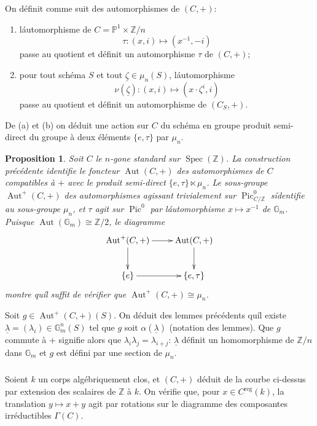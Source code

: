\documentclass{amsart}
\theoremstyle{plain}
\newtheorem{proposition}[theorem]{Proposition}
\theoremstyle{remark}
\DeclareMathOperator{\Pic}{Pic}
\DeclareMathOperator{\Aut}{Aut}
\DeclareMathOperator{\Spec}{Spec}
\newcommand{\bbG}{\mathbb{G}}
\newcommand{\bbP}{\mathbb{P}}
\newcommand{\bbZ}{\mathbb{Z}}
\begin{document}
On d\'efinit comme suit des automorphismes de $(C,+)$:
\begin{enumerate}
\item[(a)] l\'automorphisme de $C = \bbP^1 \times \bbZ/n$
\[
\tau: (x,i) \mapsto (x^{-1}, -i)
\]
passe au quotient et d\'efinit un automorphisme $\tau$ de $(C,+)$;
\item[(b)] pour tout sch\'ema $S$ et tout $\underline{\zeta} \in \mu_n(S)$, l\'automorphisme
\[
\nu(\underline{\zeta}): (x,i) \mapsto (x \cdot \zeta^i, i)
\]
passe au quotient et d\'efinit un automorphisme de $(C_S, +)$.
\end{enumerate}
De (a) et (b) on d\'eduit une action sur $C$ du sch\'ema en groupe produit semi-direct
du groupe \`a deux \'el\'ements $\{e, \tau\}$ par $\mu_n$.

\begin{proposition}
Soit $C$ le $n$-gone standard sur $\Spec(\bbZ)$. La construction pr\'ec\'edente identifie
le foncteur $\Aut(C,+)$ des automorphismes de $C$ compatibles \`a $+$ avec le produit
semi-direct $\{e, \tau\} \ltimes \mu_n$. Le sous-groupe $\Aut^+(C,+)$ des automorphismes
agissant trivialement sur $\Pic^0_{C/\bbZ}$ s\'identifie au sous-groupe $\mu_n$, et
$\tau$ agit sur $\Pic^0$ par l\'automorphisme $x \mapsto x^{-1}$ de $\bbG_m$. Puisque
$\Aut(\bbG_m) \cong \bbZ/2$, le diagramme
\[
\xymatrix{
\Aut^+(C,+) \ar[r] \ar[d] & \Aut(C,+) \ar[d] \\
\{e\} \ar[r] & \{e, \tau\}}
\]
montre qu\'il suffit de v\'erifier que $\Aut^+(C,+) \cong \mu_n$.
\end{proposition}

Soit $g \in \Aut^+(C,+)(S)$. On d\'eduit des lemmes pr\'ec\'edents qu\'il existe
$\underline{\lambda} = (\lambda_i) \in \bbG_m^n(S)$ tel que $g$ soit $\alpha(\underline{\lambda})$
(notation des lemmes). Que $g$ commute \`a $+$ signifie alors que
$\lambda_i \lambda_j = \lambda_{i+j}$: $\underline{\lambda}$ d\'efinit un homomorphisme de
$\bbZ/n$ dans $\bbG_m$ et $g$ est d\'efini par une section de $\mu_n$.

\subsubsection{}
Soient $k$ un corps alg\'ebriquement clos, et $(C,+)$ d\'eduit de la courbe ci-dessus
par extension des scalaires de $\bbZ$ \`a $k$. On v\'erifie que, pour $x \in C^{\mathrm{reg}}(k)$,
la translation $y \mapsto x+y$ agit par rotations sur le diagramme des composantes
irr\'eductibles $\Gamma(C)$.
\end{document}
